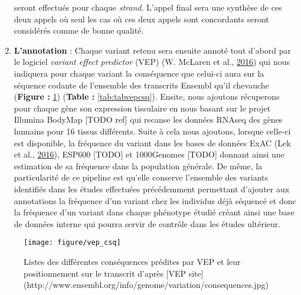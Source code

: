 \documentclass[12pt,twoside]{reedthesis}
\theoremstyle{definition}
\theoremstyle{definition}
\theoremstyle{remark}
\begin{document}
\begin{enumerate}
    seront effectués pour chaque \emph{strand}. L'appel final sera une
    synthèse de ces deux appels où seul les cas où ces deux appels sont
    concordants seront considérés comme de bonne qualité.\\
  \item
    \textbf{L'annotation} : Chaque variant retenu sera ensuite annoté tout
    d'abord par le logiciel \emph{variant effect predictor} (VEP) (W.
    McLaren et al., \protect\hyperlink{ref-McLaren2016}{2016}) qui nous
    indiquera pour chaque variant la conséquence que celui-ci aura sur la
    séquence codante de l'ensemble des transcrits Ensembl qu'il chevauche
    (\textbf{Figure : }\ref{fig:figvepcsq}) (\textbf{Table :
    }\ref{tab:tabvepcsq}). Ensite, nous ajoutons récuperons pour chaque
    gène son expression tissulaire en nous basant sur le projet Illumina
    BodyMap {[}TODO ref{]} qui recanse les données RNAseq des gènes
    humains pour 16 tissus différents. Suite à cela nous ajoutons, lorsque
    celle-ci est disponible, la fréquence du variant dans les bases de
    données ExAC (Lek et al., \protect\hyperlink{ref-Lek2016}{2016}),
    ESP600 {[}TODO{]} et 1000Genomes {[}TODO{]} donnant ainsi une
    estimation de sa fréquence dans la population générale. De même, la
    particularité de ce pipeline est qu'elle conserve l'ensemble des
    variants identifiés dans les études effectuées précédemment permettant
    d'ajouter aux annotations la fréquence d'un variant chez les individus
    déjà séquencé et donc la fréquence d'un variant dans chaque phénotype
    étudié créant ainsi une base de données interne qui pourra servir de
    contrôle dans les études ultérieur.
  \end{enumerate}
  
  \begin{figure}
  
  {\centering \texttt{[image: figure/vep\_csq]} 
  
  }
  
  \caption[Listes des différentes conséquences prédites par VEP et leur positionnement sur le transcrit]{Listes des différentes conséquences prédites par VEP et leur positionnement sur le transcrit d'après [VEP site](http://www.ensembl.org/info/genome/variation/consequences.jpg)}\label{fig:figvepcsq}
  \end{figure}
  
\end{document}
